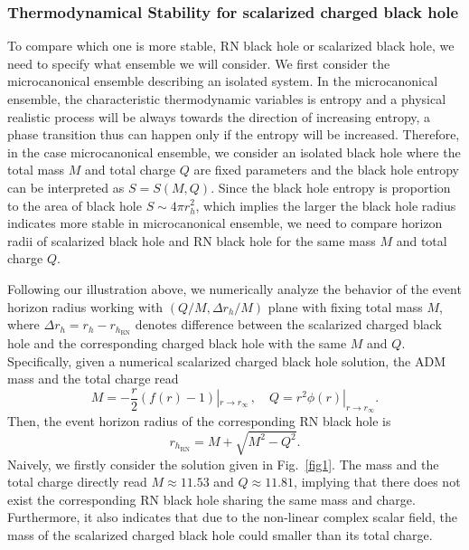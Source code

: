 \documentclass[pr, twocolumn, preprintnumbers, showpacs,footnoteadded, superscriptaddress,nofootinbib,longbibliography]{revtex4-1}
\begin{document}
\subsubsection{Thermodynamical Stability for scalarized charged black hole}
To compare which one is more stable, RN black hole or scalarized black hole, we need to specify what ensemble we will consider. We first consider the microcanonical ensemble describing an isolated system.  In the microcanonical ensemble, the characteristic thermodynamic variables is entropy and a physical realistic process will be always towards the direction of increasing entropy, a phase transition thus can happen only if the entropy will be increased. Therefore, in the case microcanonical ensemble, we consider an isolated black hole where the total mass $M$ and total charge $Q$ are fixed parameters and the black hole entropy can be interpreted as $S=S(M,Q)$. Since the black hole entropy is proportion to the area of black hole $S \sim 4\pi r_h^2$, which implies the larger the black hole radius indicates more stable in microcanonical ensemble, we need to compare horizon radii of scalarized black hole and RN black hole for the same mass $M$ and total charge $Q$.


Following our illustration above, we numerically analyze the behavior of the event horizon radius working with $(Q/M, \Delta r_h/M)$ plane with fixing total mass $M$, where $\Delta r_h=r_{h}-r_{h_{\text{RN}}}$ denotes difference between the scalarized charged black hole and the corresponding charged black hole with the same $M$ and $Q$.  Specifically, given a numerical scalarized charged black hole solution, the ADM mass and the total charge read
%
\begin{equation}\label{MQ}
M=-\frac{r}{2}(f(r)-1)|_{r \to r_{\infty}} \, , \quad Q= r^2 \phi (r) |_{r \to r_{\infty}}.
\end{equation}
%
Then, the event horizon radius of the corresponding RN black hole is
%
\begin{equation}
r_{h_{\text{RN}}}=M+\sqrt{M^2-Q^2}.
\end{equation}
%
Naively, we firstly consider the solution given in Fig.~\ref{fig1}. The mass and the total charge directly read $M \approx 11.53$ and $Q \approx 11.81$, implying that there does not exist the corresponding RN black hole sharing the same mass and charge. Furthermore, it also indicates that due to the non-linear complex scalar field, the mass of the scalarized charged black hole could smaller than its total charge.
\end{document}
